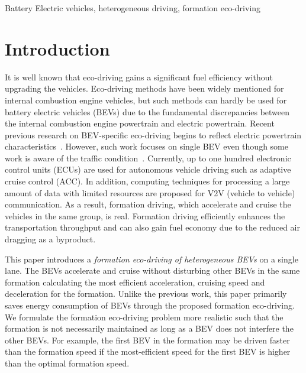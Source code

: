 \documentclass{IEEEtran}
\begin{document}
\begin{IEEEkeywords}
Battery Electric vehicles, heterogeneous driving, formation eco-driving
\end{IEEEkeywords}



\section{Introduction}

It is well known that eco-driving gains a significant fuel efficiency without upgrading the vehicles.
Eco-driving methods have been widely mentioned for internal combustion engine vehicles, but such methods can hardly be used for battery electric vehicles (BEVs) due to the fundamental discrepancies between the internal combustion engine powertrain and electric powertrain.
Recent previous research on BEV-specific eco-driving begins to reflect electric powertrain characteristics~\cite{Lin:ICCA14, Wu:ITS15, Dib:IVPPC11}. However, such work focuses on single BEV even though some work is aware of the traffic condition~\cite{Dib:CEP14, Wu:ITS15}. 
Currently, up to one hundred electronic control units (ECUs) are used for autonomous vehicle driving such as adaptive cruise control (ACC). In addition, computing techniques for processing a large amount of data with limited resources are proposed for V2V (vehicle to vehicle) communication. As a result, formation driving, which accelerate and cruise the vehicles in the same group, is real. Formation driving efficiently enhances the transportation throughput and can also gain fuel economy due to the reduced air dragging as a byproduct.

This paper introduces a \textit{formation eco-driving of heterogeneous BEVs} on a single lane. The BEVs accelerate and cruise without disturbing other BEVs in the same formation calculating the most efficient acceleration, cruising speed and deceleration for the formation. Unlike the previous work, this paper primarily saves energy consumption of BEVs through the proposed formation eco-driving. 
We formulate the formation eco-driving problem more realistic such that the formation is not necessarily maintained as long as a BEV does not interfere the other BEVs. For example, the first BEV in the formation may be driven faster than the formation speed if the most-efficient speed for the first BEV is higher than the optimal formation speed. 
\end{document}
